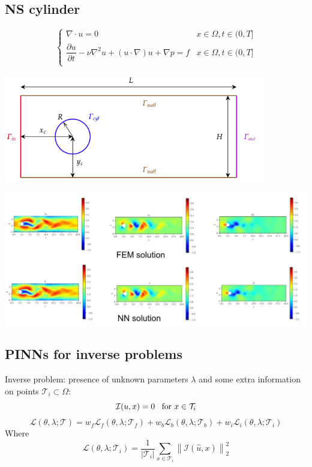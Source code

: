 \subsection*{NS cylinder}
\[
    \begin{cases}
        \nabla \cdot u = 0 & x \in \Omega, t \in (0, T]\\
        \dfrac{\partial u}{\partial t} - \nu \nabla^2 u + (u \cdot \nabla)u + \nabla p = f & x \in \Omega, t \in (0, T]\\
    \end{cases}
\]
\begin{center}
    \includegraphics[scale=0.3]{../images/NS_Cylinder1.png}
\end{center}
\begin{center}
    \includegraphics[scale=0.3]{../images/FEM_PINN_Solution.png}
\end{center}

\subsection*{PINNs for inverse problems}
Inverse problem: presence of unknown parameters $\lambda$ and some extra information on points $\mathcal{T}_i \subset \Omega$:
\[
    \mathcal{I}(u,x) = 0 \hspace{0.3cm}\text{for } x \in \mathcal{T}_i    
\]
\[
    \mathcal{L}(\theta, \lambda; \mathcal{T}) = w_f \mathcal{L}_f(\theta, \lambda; \mathcal{T}_f) + w_b \mathcal{L}_b(\theta, \lambda; \mathcal{T}_b) + w_i \mathcal{L}_i(\theta, \lambda; \mathcal{T}_i)    
\]
Where
\[
    \mathcal{L}(\theta, \lambda; \mathcal{T}_i) = \dfrac{1}{|\mathcal{T}_i|} \sum_{x \in \mathcal{T}_i} \left\|\mathcal{I}(\hat{u},x)\right\|^2_2
\]